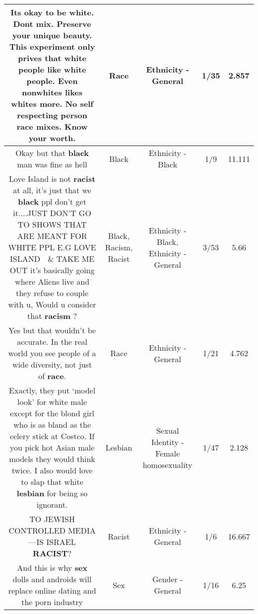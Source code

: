 \documentclass[11pt]{article}
\newlength\mylength
\begin{document}
\begin{center}
\begin{longtable}{|C{.65\mylength}|C{.30\mylength}|C{.12\mylength}|C{.12\mylength}|C{.12\mylength}|}
  \small Its okay to be white. Dont mix. Preserve your unique beauty. This experiment only prives that white people like white people. Even nonwhites likes whites more. No self respecting person \textbf{race} mixes. Know your worth.\normalsize   & Race & Ethnicity - General & 1/35 & 2.857 \\  \hline
  \small Okay but that \textbf{black} man was fine as hell\normalsize   & Black & Ethnicity - Black & 1/9 & 11.111 \\  \hline
  \small Love Island is not \textbf{racist} at all, it's just that we \textbf{black} ppl don't get it....JUST DON'T GO TO SHOWS THAT ARE MEANT FOR  WHITE PPL E.G LOVE ISLAND 🌴 \& TAKE ME OUT it's basically going where Aliens live and  they refuse to couple with u, Would u consider that \textbf{racism} ?\normalsize   & Black, Racism, Racist & Ethnicity - Black, Ethnicity - General & 3/53 & 5.66 \\  \hline
  \small Yes but that wouldn't be accurate. In the real world you see people of a wide diversity, not just of \textbf{race}.\normalsize   & Race & Ethnicity - General & 1/21 & 4.762 \\  \hline
  \small Exactly, they put ‘model look' for white male except for the blond girl who is as bland as the celery stick at Costco. If you pick hot Asian male models they would think twice. I also would love to slap that white \textbf{lesbian} for being so ignorant.\normalsize   & Lesbian & Sexual Identity - Female homosexuality & 1/47 & 2.128 \\  \hline
  \small TO JEWISH CONTROLLED MEDIA---IS ISRAEL \textbf{RACIST}?\normalsize   & Racist & Ethnicity - General & 1/6 & 16.667 \\  \hline
  \small And this is why \textbf{sex} dolls and androids will replace online dating and the porn industry\normalsize   & Sex & Gender - General & 1/16 & 6.25 \\  \hline

\end{longtable}
\end{center}
\end{document}
